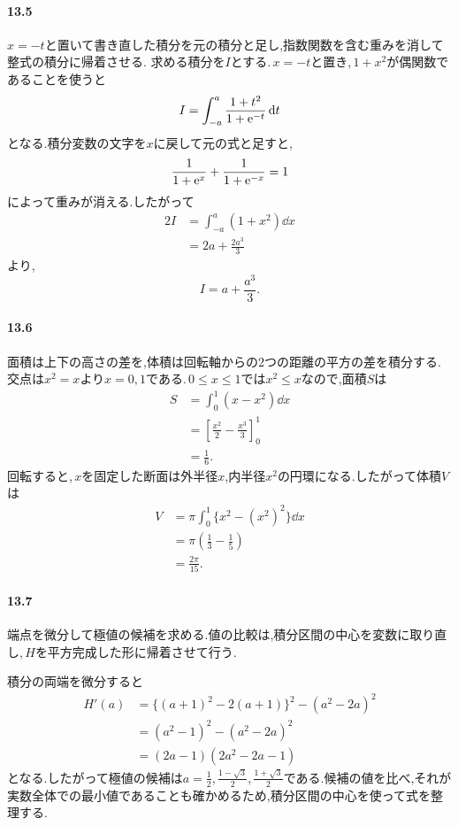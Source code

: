 \paragraph{13.5}
$x=-t$と置いて書き直した積分を元の積分と足し,指数関数を含む重みを消して整式の積分に帰着させる.
求める積分を$I$とする.\,$x=-t$と置き,\,$1+x^2$が偶関数であることを使うと
\[
 I=\int_{-a}^{a}\frac{1+t^2}{1+\mathrm{e}^{-t}}\,\mathrm{d} t
\]
となる.積分変数の文字を$x$に戻して元の式と足すと,
\[
 \frac1{1+\mathrm{e}^x}+\frac1{1+\mathrm{e}^{-x}}=1
\]
によって重みが消える.したがって
\[
 \begin{aligned}
 2I&=\int_{-a}^{a}(1+x^2)\dd x\\
 &=2a+\frac{2a^3}{3}
 \end{aligned}
\]
より,
\[
 \boxed{I=a+\frac{a^3}{3}}.
\]

\paragraph{13.6}
面積は上下の高さの差を,体積は回転軸からの2つの距離の平方の差を積分する.
交点は$x^2=x$より$x=0,1$である.\,$0\le x\le1$では$x^2\le x$なので,面積$S$は
\[
 \begin{aligned}
 S&=\int_0^1(x-x^2)\dd x\\
 &=\left[\frac{x^2}{2}-\frac{x^3}{3}\right]_0^1\\
 &=\boxed{\frac16}.
 \end{aligned}
\]
回転すると,\,$x$を固定した断面は外半径$x$,内半径$x^2$の円環になる.したがって体積$V$は
\[
 \begin{aligned}
 V&=\pi\int_0^1\{x^2-(x^2)^2\}\dd x\\
 &=\pi\left(\frac13-\frac15\right)\\
 &=\boxed{\frac{2\pi}{15}}.
 \end{aligned}
\]

\paragraph{13.7}
端点を微分して極値の候補を求める.値の比較は,積分区間の中心を変数に取り直し,\,$H$を平方完成した形に帰着させて行う.

積分の両端を微分すると
\[
 \begin{aligned}
 H'(a)&=\{(a+1)^2-2(a+1)\}^2-(a^2-2a)^2\\
 &=(a^2-1)^2-(a^2-2a)^2\\
 &=(2a-1)(2a^2-2a-1)
 \end{aligned}
\]
となる.したがって極値の候補は$a=\frac12,\frac{1-\sqrt3}{2},\frac{1+\sqrt3}{2}$である.候補の値を比べ,それが実数全体での最小値であることも確かめるため,積分区間の中心を使って式を整理する.

